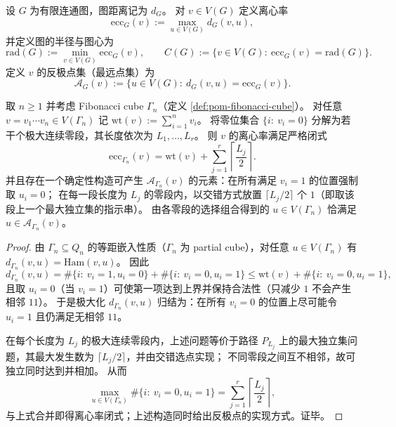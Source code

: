 \begin{definition}\label{def:pom-fibcube-ecc-rad-center-antipodes}
设 \(G\) 为有限连通图，图距离记为 \(d_G\)。
对 \(v\in V(G)\) 定义离心率
\[
\mathrm{ecc}_G(v):=\max_{u\in V(G)} d_G(v,u),
\]
并定义图的半径与图心为
\[
\mathrm{rad}(G):=\min_{v\in V(G)}\mathrm{ecc}_G(v),
\qquad
C(G):=\{v\in V(G):\ \mathrm{ecc}_G(v)=\mathrm{rad}(G)\}.
\]
定义 \(v\) 的反极点集（最远点集）为
\[
\mathcal{A}_G(v):=\{u\in V(G):\ d_G(v,u)=\mathrm{ecc}_G(v)\}.
\]
\end{definition}

\begin{theorem}\label{thm:pom-fibcube-eccentricity-closed-form}
取 \(n\ge 1\) 并考虑 Fibonacci cube \(\Gamma_n\)（定义 \ref{def:pom-fibonacci-cube}）。
对任意 \(v=v_1\cdots v_n\in V(\Gamma_n)\) 记 \(\mathrm{wt}(v):=\sum_{i=1}^n v_i\)。
将零位集合 \(\{i:\ v_i=0\}\) 分解为若干个极大连续零段，其长度依次为 \(L_1,\dots,L_r\)。
则 \(v\) 的离心率满足严格闭式
\[
\mathrm{ecc}_{\Gamma_n}(v)=\mathrm{wt}(v)+\sum_{j=1}^{r}\left\lceil\frac{L_j}{2}\right\rceil.
\]
并且存在一个确定性构造可产生 \(\mathcal{A}_{\Gamma_n}(v)\) 的元素：在所有满足 \(v_i=1\) 的位置强制取 \(u_i=0\)；
在每一段长度为 \(L_j\) 的零段内，以交错方式放置 \(\lceil L_j/2\rceil\) 个 \(1\)（即取该段上一个最大独立集的指示串）。
由各零段的选择组合得到的 \(u\in V(\Gamma_n)\) 恰满足 \(u\in\mathcal{A}_{\Gamma_n}(v)\)。
\end{theorem}
\begin{proof}
由 \(\Gamma_n\subseteq Q_n\) 的等距嵌入性质（\(\Gamma_n\) 为 partial cube），对任意 \(u\in V(\Gamma_n)\) 有
\(
d_{\Gamma_n}(v,u)=\mathrm{Ham}(v,u)
\)。
因此
\[
d_{\Gamma_n}(v,u)=\#\{i:\ v_i=1,u_i=0\}+\#\{i:\ v_i=0,u_i=1\}
\le \mathrm{wt}(v)+\#\{i:\ v_i=0,u_i=1\},
\]
且取 \(u_i=0\)（当 \(v_i=1\)）可使第一项达到上界并保持合法性（只减少 \(1\) 不会产生相邻 \(11\)）。
于是极大化 \(d_{\Gamma_n}(v,u)\) 归结为：在所有 \(v_i=0\) 的位置上尽可能令 \(u_i=1\) 且仍满足无相邻 \(11\)。
\par
在每个长度为 \(L_j\) 的极大连续零段内，上述问题等价于路径 \(P_{L_j}\) 上的最大独立集问题，其最大发生数为 \(\lceil L_j/2\rceil\)，并由交错选点实现；
不同零段之间互不相邻，故可独立同时达到并相加。
从而
\[
\max_{u\in V(\Gamma_n)}\#\{i:\ v_i=0,u_i=1\}
=\sum_{j=1}^{r}\left\lceil\frac{L_j}{2}\right\rceil,
\]
与上式合并即得离心率闭式；上述构造同时给出反极点的实现方式。证毕。
\end{proof}

